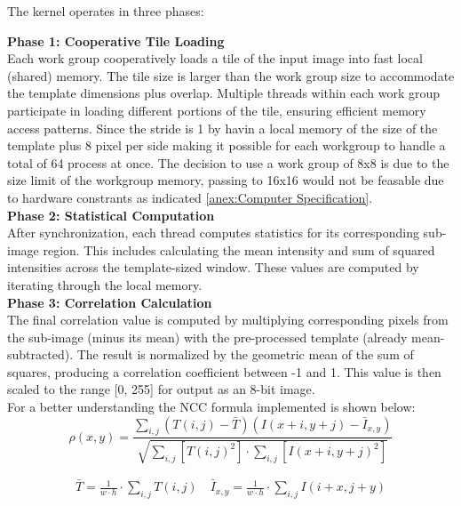 \documentclass[12pt]{article}
\begin{document}
The kernel operates in three phases:

\textbf{Phase 1: Cooperative Tile Loading} \\
Each work group cooperatively loads a tile of the input image into fast local (shared) memory. The tile size is larger than the work group size to accommodate the template dimensions plus overlap. Multiple threads within each work group participate in loading different portions of the tile, ensuring efficient memory access patterns. Since the stride is 1 by havin a local memory of the size of the template plus 8 pixel per side making it possible for each workgroup to handle a total of 64 process at once. The decision to use a work group of 8x8 is due to the size limit of the workgroup memory, passing to 16x16 would not be feasable due to hardware constrants as indicated \cref{anex:Computer Specification}.\\

\textbf{Phase 2: Statistical Computation} \\
After synchronization, each thread computes statistics for its corresponding sub-image region. This includes calculating the mean intensity and sum of squared intensities across the template-sized window. These values are computed by iterating through the local memory.\\

\textbf{Phase 3: Correlation Calculation} \\
The final correlation value is computed by multiplying corresponding pixels from the sub-image (minus its mean) with the pre-processed template (already mean-subtracted). The result is normalized by the geometric mean of the sum of squares, producing a correlation coefficient between -1 and 1. This value is then scaled to the range [0, 255] for output as an 8-bit image.\\

For a better understanding the NCC formula implemented is shown below:
\begin{equation}
    \rho(x,y) = \frac{\sum_{i,j}(T(i,j) - \bar{T})(I(x+i,y+j) - \bar{I}_{x,y})}
    {\sqrt{\sum_{i,j} \left[ {T(i,j)}^2 \right] \cdot \sum_{i,j} \left[{I(x+i,y+j)}^2\right] }}
\end{equation}

\begin{align*}
    \bar{T} = \frac{1}{w\cdot h}\cdot \sum_{i,j}T(i,j) \quad \bar{I}_{x,y} = \frac{1}{w\cdot h}\cdot \sum_{i,j}I(i+x,j+y)
\end{align*}
\end{document}

